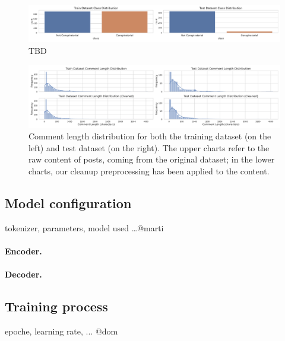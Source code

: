 \documentclass[11pt]{article}
\begin{document}
\begin{figure}
  \centering
  \includegraphics[width=\textwidth]{figures/class_distribution.pdf}
  \caption{TBD}
  \label{fig:class-frequency}
\end{figure}

\begin{figure}
  \centering
  \includegraphics[width=\textwidth]{figures/comment_length_distribution.pdf}
  \caption{
    Comment length distribution for both the training dataset (on the left) and test dataset
    (on the right).
    The upper charts refer to the raw content of posts, coming from the original dataset;
    in the lower charts, our cleanup preprocessing has been applied to the content.
  }
  \label{fig:words-distribution}
\end{figure}

\subsection{Model configuration}\label{sec:model-config}
tokenizer, parameters, model used \dots @marti    

\paragraph{Encoder.}

\paragraph{Decoder.}


\subsection{Training process}\label{sec:training-process}
epoche, learning rate, ... @dom
\end{document}
